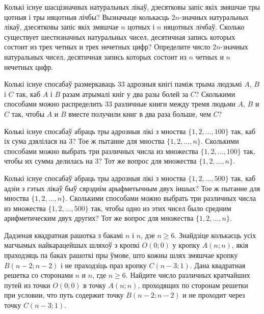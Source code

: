 \documentclass[12pt, a4paper]{article}
\begin{document}
\begin{problemList}
\bigskip

\problemItemSimple
{Колькі існуе шасцізначных натуральных лікаў, дзесятковы запіс якіх змяшчае тры цотныя
і тры няцотныя лічбы? Вызначыце колькасць $2n$-значных натуральных лікаў,
дзесятковы запіс якіх змяшчае $n$ цотных і $n$ няцотных лічбаў.}
{Сколько существует шестизначных натуральных чисел, десятичная запись
которых состоит из трех четных и трех нечетных цифр? Определите число
$2n$-значных натуральных чисел, десятичная запись которых
состоит из $n$ четных и $n$ нечетных цифр.}

\bigskip

\problemItemSimple
{Колькі існуе спосабаў размеркаваць 33 адрозныя кнігі паміж трыма людзьмі
$A$, $B$ і $C$ так, каб $A$ і $B$ разам атрымалі кніг у два разы болей за $C$?}
{Сколькими способами можно распределить 33 различные книги между тремя
людьми $A$, $B$ и $C$ так, чтобы $A$ и $B$ вместе получили книг в два
раза больше, чем $C$?}

\bigskip

\problemItemSimple
{Колькі існуе спосабаў абраць тры адрозныя лікі з мноства $\{1, 2, \ldots, 100\}$ так,
каб іх сума дзялілася на 3? Тое ж пытанне для мноства $\{1, 2, \ldots, n\}$.}
{Сколькими способами можно выбрать три различных числа из множества
$\{1, 2, \ldots, 100\}$ так, чтобы их сумма делилась на 3? Тот же
вопрос для множества $\{1, 2, \ldots, n\}$.}

\bigskip

\problemItemSimple
{Колькі існуе спосабаў абраць тры адрозныя лікі з мноства $\{1, 2, \ldots, 500\}$ так,
каб адзін з гэтых лікаў быў сярэднім арыфметычным двух іншых?
Тое ж пытанне для мноства $\{1, 2, \ldots, n\}$.}
{Сколькими способами можно выбрать три различных числа из множества
$\{1, 2, \ldots, 500\}$ так, чтобы одно из этих чисел было средним
арифметическим двух других? Тот же вопрос для множества
$\{1, 2, \ldots, n\}$.}

\bigskip

\problemItemSimple
{Дадзеная квадратная рашотка з бакамі $n$ і $n$, дзе $n \ge 6$. Знайдзіце
колькасць усіх магчымых найкарацейшых шляхоў з кропкі $O(0; 0)$ у кропку $A(n; n)$,
якія праходзяць па баках рашоткі пры ўмове, што кожны шлях змяшчае кропку
$B(n - 2; n - 2)$ і не праходзіць праз кропку $C(n - 3; 1)$.}
{Дана квадратная решетка со сторонами $n$ и $n$, где $n \ge 6$. Найдите
число различных кратчайших путей из точки $O(0; 0)$ в точку $A(n; n)$,
проходящих по сторонам решетки при условии, что путь содержит точку
$B(n - 2; n - 2)$ и не проходит через точку $C(n - 3; 1)$.}


\end{problemList}
\end{document}
